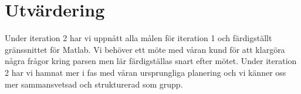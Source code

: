 \section{Utvärdering}
Under iteration 2 har vi uppnått alla målen för iteration 1 och färdigställt gränssnittet för Matlab. Vi behöver ett möte med våran kund för att klargöra några frågor kring parsen men lär färdigställas snart efter mötet. Under iteration 2 har vi hamnat mer i fas med våran ursprungliga planering och vi känner oss mer sammansvetsad och strukturerad som grupp. 